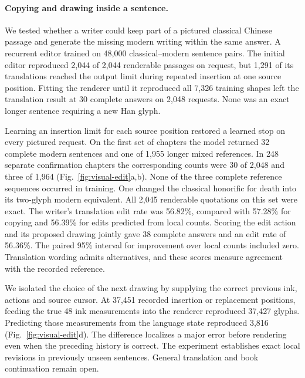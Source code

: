 \documentclass[12pt,a4paper]{article}
\providecommand{\DIFadd}[1]{{\protect\color{blue} \sf #1}} %
\begin{document}
\paragraph{\DIFadd{Copying and drawing inside a sentence.}}
\DIFadd{We tested whether a writer could keep part of a pictured classical Chinese passage and generate the missing modern writing within the same answer. A recurrent editor trained on 48,000 classical--modern sentence pairs. The initial editor reproduced 2,044 of 2,044 renderable passages on request, but 1,291 of its translations reached the output limit during repeated insertion at one source position. Fitting the renderer until it reproduced all 7,326 training shapes left the translation result at 30 complete answers on 2,048 requests. None was an exact longer sentence requiring a new Han glyph.
}

\DIFadd{Learning an insertion limit for each source position restored a learned stop on every pictured request. On the first set of chapters the model returned 32 complete modern sentences and one of 1,955 longer mixed references. In 248 separate confirmation chapters the corresponding counts were 30 of 2,048 and three of 1,964 (Fig.~\ref{fig:visual-edit}a,b). None of the three complete reference sequences occurred in training. One changed the classical honorific for death into its two-glyph modern equivalent. All 2,045 renderable quotations on this set were exact. The writer's translation edit rate was 56.82\%, compared with 57.28\% for copying and 56.39\% for edits predicted from local counts. Scoring the edit action and its proposed drawing jointly gave 38 complete answers and an edit rate of 56.36\%. The paired 95\% interval for improvement over local counts included zero. Translation wording admits alternatives, and these scores measure agreement with the recorded reference.
}

\DIFadd{We isolated the choice of the next drawing by supplying the correct previous ink, actions and source cursor. At 37,451 recorded insertion or replacement positions, feeding the true 48 ink measurements into the renderer reproduced 37,427 glyphs. Predicting those measurements from the language state reproduced 3,816 (Fig.~\ref{fig:visual-edit}d). The difference localizes a major error before rendering even when the preceding history is correct. The experiment establishes exact local revisions in previously unseen sentences. General translation and book continuation remain open.
}
\end{document}
